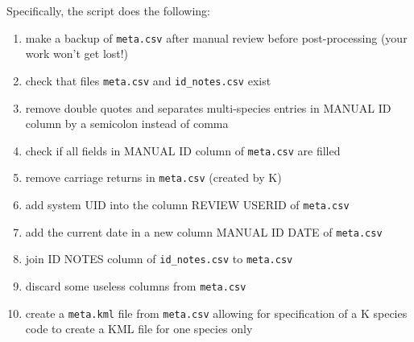 \documentclass[English, 11pt, twoside, authoryear]{article}
\begin{document}
Specifically, the script does the following:
\begin{enumerate}
\item make a backup of \texttt{meta.csv} after manual review before post-processing (your work won't get lost!)
\item check that files \texttt{meta.csv} and \texttt{id\_notes.csv} exist
\item remove double quotes and separates multi-species entries in MANUAL ID column by a semicolon instead of comma
\item check if all fields in MANUAL ID column of \texttt{meta.csv} are filled
\item remove carriage returns in \texttt{meta.csv} (created by \textsf{K})
\item add system UID into the column REVIEW USERID of \texttt{meta.csv}
\item add the current date in a new column MANUAL ID DATE of \texttt{meta.csv}
\item join ID NOTES column of \texttt{id\_notes.csv} to \texttt{meta.csv}
\item discard some useless columns from \texttt{meta.csv}
\item create a \texttt{meta.kml} file from \texttt{meta.csv} allowing for specification of a \textsf{K} species code to create a KML file for one species only
\end{enumerate}
\end{document}

